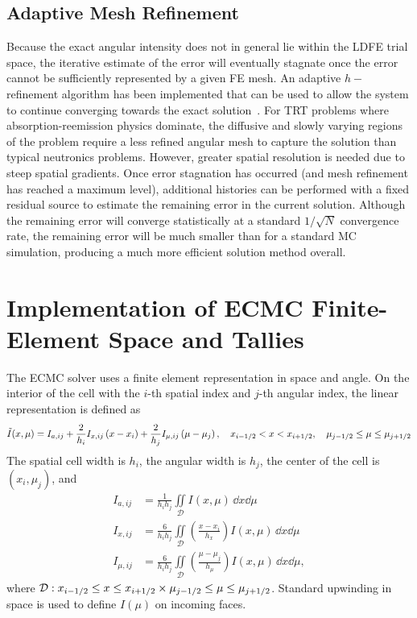 \subsection{Adaptive Mesh Refinement}

Because the exact angular intensity does not in general lie within the LDFE trial space, the
iterative estimate of the error will eventually stagnate once the error cannot be sufficiently
represented by a given FE mesh.  An adaptive $h-$refinement algorithm has been
implemented that can be used to allow the system to continue converging towards the
exact solution~\cite{jake,ans_2014}. For TRT problems where absorption-reemission physics dominate, the diffusive and slowly varying
regions of the problem require a less refined angular mesh to capture the solution than typical neutronics
problems.  However, greater spatial resolution is needed due to steep spatial
gradients.   
Once error stagnation has occurred (and mesh refinement has reached a maximum level),
additional histories can be performed with a
fixed residual source to estimate the remaining error in the current solution.  Although the remaining error will
converge statistically at a standard $1/\sqrt{N}$ convergence rate, the remaining
error will be much smaller than for a standard MC simulation, producing a much more
efficient solution method overall.


\section{Implementation of ECMC Finite-Element Space and Tallies}
\label{sec:tallies}

The ECMC solver uses a finite element representation in space and angle. On the
interior of the cell with the $i$-th spatial index and $j$-th angular index, the linear representation is defined as
\begin{equation*}
    \tilde I(x,\mu) = I_{a,ij} + \frac{2}{h_i}I_{x,ij}\left(x-x_i\right) +
    \frac{2}{h_j}I_{\mu,ij}\left(\mu-\mu_j\right), \quad x_{{i-1/2}} <  x < x_{{i+1/2}},\quad
     \mu_{j-1/2} \leq \mu \leq \mu_{j+1/2}
\end{equation*}
The spatial cell width is $h_i$, the angular width is
$h_j$, the center of the cell is $(x_i,\mu_j)$, and
\begin{align}\label{app1}
    I_{a,ij} &= \frac{1}{h_i h_j} \iint\limits_{\mathcal{D}} I(x,\mu)\, \dd x \dd \mu \\
    I_{x,ij} &= \frac{6}{h_ih_j}\iint\limits_{\mathcal{D}} \left(\frac{x - x_i}{h_{x}}\right)
    I(x,\mu)\, \dd x \dd \mu \\ \label{app2}
    I_{\mu,ij} &= \frac{6}{h_ih_j}\iint\limits_{\mathcal{D}}
     \left(\frac{\mu - \mu_j}{h_{\mu}}\right)
    I(x,\mu)\, \dd x \dd \mu,
\end{align}
where $\mathcal{D}: x_{{i-1/2}} \leq  x \leq  x_{{i+1/2}} \times \mu_{j-1/2} \leq \mu \leq \mu_{j+1/2}$.
Standard upwinding in space is used to
define $I(\mu)$ on incoming faces. 

